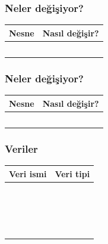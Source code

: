\documentclass[12pt, a4paper]{article}
\begin{document}
\vspace{5ex}

\subsubsection*{Neler değişiyor?}
\begin{tabular}{| p{4cm} | p{11cm} |  }
\hline			
Nesne&Nasıl değişir?\\
\hline
& \\[6ex]
\hline  
& \\[6ex]
\hline  
& \\[6ex]
\hline  
& \\[6ex]
\hline  
& \\[6ex]
\hline  
\end{tabular}


\subsubsection*{Neler değişiyor?}
\begin{tabular}{| p{4cm} | p{11cm} |  }
\hline			
Nesne&Nasıl değişir?\\
\hline
& \\[6ex]
\hline  
& \\[6ex]
\hline  
& \\[6ex]
\hline  
& \\[6ex]
\hline  
& \\[6ex]
\hline  
\end{tabular}


\subsubsection*{Veriler}
\begin{tabular}{| p{4cm} | p{11cm} |  }
\hline			
Veri ismi&Veri tipi\\
\hline
& \\[2ex]
\hline  
& \\[2ex]
\hline  
& \\[2ex]
\hline  
& \\[2ex]
\hline  
& \\[2ex]
\hline  
& \\[2ex]
\hline  
& \\[2ex]
\hline  
& \\[2ex]
\hline  
& \\[2ex]
\hline  
& \\[2ex]
\hline  
& \\[2ex]
\hline  
& \\[2ex]
\hline  
& \\[2ex]
\hline  
& \\[2ex]
\hline  
& \\[2ex]
\hline  
& \\[2ex]
\hline  
& \\[2ex]
\hline  
& \\[2ex]
\hline  
\end{tabular}
\veriyapi{ }
\end{document}
